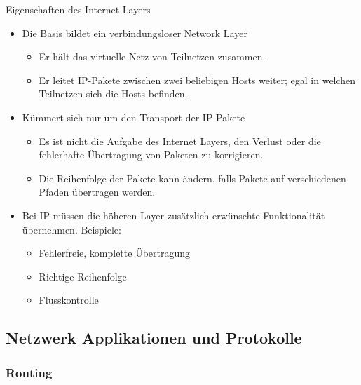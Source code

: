 \begin{concept}{Eigenschaften des Internet Layers}
    \begin{itemize}
        \item Die Basis bildet ein verbindungsloser Network Layer
        \begin{itemize}
            \item Er hält das virtuelle Netz von Teilnetzen zusammen.
            \item Er leitet IP-Pakete zwischen zwei beliebigen Hosts weiter; egal in welchen Teilnetzen sich die Hosts befinden.
        \end{itemize}
        \item Kümmert sich nur um den Transport der IP-Pakete
        \begin{itemize}
            \item Es ist nicht die Aufgabe des Internet Layers, den Verlust oder die fehlerhafte Übertragung von Paketen zu korrigieren.
            \item Die Reihenfolge der Pakete kann ändern, falls Pakete auf verschiedenen Pfaden übertragen werden.
        \end{itemize}
        \item Bei IP müssen die höheren Layer zusätzlich erwünschte Funktionalität übernehmen. Beispiele:
        \begin{itemize}
            \item Fehlerfreie, komplette Übertragung
            \item Richtige Reihenfolge
            \item Flusskontrolle
        \end{itemize}
    \end{itemize}
\end{concept}

\subsection{Netzwerk Applikationen und Protokolle}

\subsubsection{Routing}

